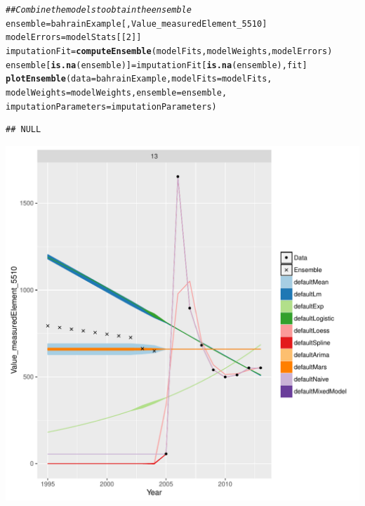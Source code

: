 \documentclass[nojss]{jss}\usepackage[]{graphicx}\usepackage[]{color}
\makeatletter
\def\maxwidth{ %
  \ifdim\Gin@nat@width>\linewidth
    \linewidth
  \else
    \Gin@nat@width
  \fi
}
\newcommand{\hlnum}[1]{\textcolor[rgb]{0.686,0.059,0.569}{#1}}%
\newcommand{\hlcom}[1]{\textcolor[rgb]{0.678,0.584,0.686}{\textit{#1}}}%
\newcommand{\hlstd}[1]{\textcolor[rgb]{0.345,0.345,0.345}{#1}}%
\newcommand{\hlkwb}[1]{\textcolor[rgb]{0.69,0.353,0.396}{#1}}%
\newcommand{\hlkwc}[1]{\textcolor[rgb]{0.333,0.667,0.333}{#1}}%
\newcommand{\hlkwd}[1]{\textcolor[rgb]{0.737,0.353,0.396}{\textbf{#1}}}%
\newenvironment{kframe}{%
 \def\at@end@of@kframe{}%
 \ifinner\ifhmode%
  \def\at@end@of@kframe{\end{minipage}}%
  \begin{minipage}{\columnwidth}%
 \fi\fi%
 \def\FrameCommand##1{\hskip\@totalleftmargin \hskip-\fboxsep
 \colorbox{shadecolor}{##1}\hskip-\fboxsep
     \hskip-\linewidth \hskip-\@totalleftmargin \hskip\columnwidth}%
 \MakeFramed {\advance\hsize-\width
   \@totalleftmargin\z@ \linewidth\hsize
   \@setminipage}}%
 {\par\unskip\endMakeFramed%
 \at@end@of@kframe}
\newenvironment{knitrout}{}{} %
\makeatother
\begin{document}
\begin{knitrout}
\color{fgcolor}\begin{kframe}
\begin{alltt}
\hlcom{## Combine the models to obtain the ensemble}
\hlstd{ensemble} \hlkwb{=} \hlstd{bahrainExample[, Value_measuredElement_5510]}
\hlstd{modelErrors} \hlkwb{=} \hlstd{modelStats[[}\hlnum{2}\hlstd{]]}
\hlstd{imputationFit} \hlkwb{=} \hlkwd{computeEnsemble}\hlstd{(modelFits, modelWeights, modelErrors)}
\hlstd{ensemble[}\hlkwd{is.na}\hlstd{(ensemble)]} \hlkwb{=} \hlstd{imputationFit[}\hlkwd{is.na}\hlstd{(ensemble), fit]}
\hlkwd{plotEnsemble}\hlstd{(}\hlkwc{data} \hlstd{= bahrainExample,} \hlkwc{modelFits} \hlstd{= modelFits,}
             \hlkwc{modelWeights} \hlstd{= modelWeights,} \hlkwc{ensemble} \hlstd{= ensemble,}
             \hlkwc{imputationParameters} \hlstd{= imputationParameters)}
\end{alltt}
\begin{verbatim}
## NULL
\end{verbatim}
\end{kframe}

{\centering \includegraphics[width=\maxwidth]{figure/unnamed-chunk-8-1} 

}



\end{knitrout}
\end{document}
